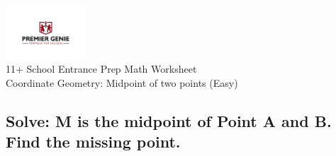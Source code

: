 \documentclass{article}
\begin{document}
\begin{center}
\includegraphics[width=3cm]{PREMGENIEJPG.jpg}\\
{\Large 11+ School Entrance Prep Math Worksheet}\\
{\Medium Coordinate Geometry: Midpoint of two points (Easy)}\\

\end{center}

\subsection*{Solve: M is the midpoint of Point A and B. Find the missing point.}
\end{document}
